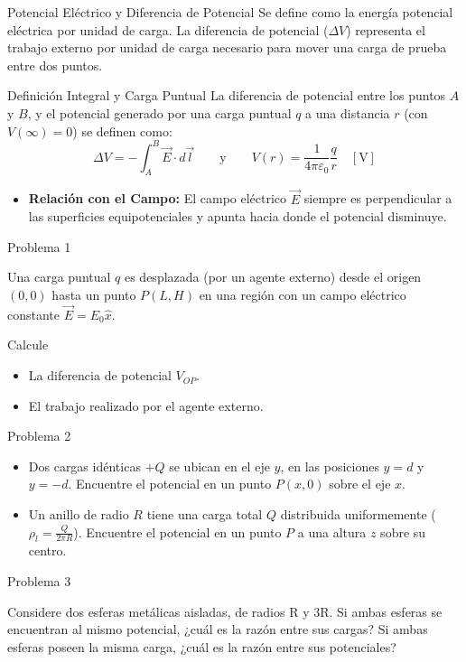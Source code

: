 \documentclass[10pt, aspectratio=169]{beamer}
\begin{document}
\primeraDiapo

\begin{frame}{Potencial Eléctrico y Diferencia de Potencial}
    Se define como la energía potencial eléctrica por unidad de carga. La diferencia de potencial ($\Delta V$) representa el trabajo externo por unidad de carga necesario para mover una carga de prueba entre dos puntos.

    \begin{boxTeoria}{Definición Integral y Carga Puntual}
        La diferencia de potencial entre los puntos $A$ y $B$, y el potencial generado por una carga puntual $q$ a una distancia $r$ (con $V(\infty)=0$) se definen como:
        \begin{equation*}
            \Delta V = -\int_{A}^{B} \vec{E} \cdot d\vec{l} \qquad \text{y} \qquad V(r) = \frac{1}{4\pi\varepsilon_0} \frac{q}{r} \quad [\unit{\V}]
        \end{equation*}
    \end{boxTeoria}

    \begin{itemize}
        \item \textbf{Relación con el Campo:} El campo eléctrico $\vec{E}$ siempre es perpendicular a las superficies equipotenciales y apunta hacia donde el potencial disminuye.
    \end{itemize}
\end{frame}

\begin{frame}{Problema 1}

    Una carga puntual $q$ es desplazada (por un agente externo) desde el origen $(0,0)$ hasta un punto $P(L, H)$ en una región con un campo eléctrico constante $\vec{E} = E_0 \hat{x}$.

    Calcule
    \begin{itemize}
        \item La diferencia de potencial $V_{OP}$.
        \item El trabajo realizado por el agente externo.
    \end{itemize}

\end{frame}

\begin{frame}{Problema 2}

    \begin{itemize}
        \item Dos cargas idénticas $+Q$ se ubican en el eje $y$, en las posiciones $y = d$ y $y = -d$. Encuentre el potencial en un punto $P(x, 0)$ sobre el eje $x$.
        \item Un anillo de radio $R$ tiene una carga total $Q$ distribuida uniformemente ($\rho_l = \frac{Q}{2\pi R}$). Encuentre el potencial en un punto $P$ a una altura $z$ sobre su centro.
    \end{itemize}

\end{frame}

\begin{frame}{Problema 3}

    Considere dos esferas metálicas aisladas, de radios R y 3R. Si ambas esferas se encuentran al mismo potencial, ¿cuál
    es la razón entre sus cargas? Si ambas esferas poseen la misma carga, ¿cuál es la razón entre sus potenciales?

\end{frame}
\end{document}
